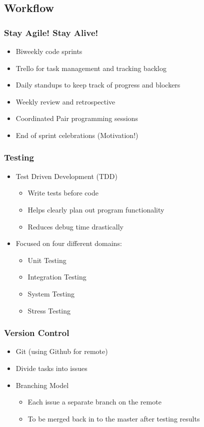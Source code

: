 \documentclass{beamer}
\begin{document}
\subsection{Workflow}
\begin{frame}
\frametitle{Stay Agile! Stay Alive!}
\begin{itemize}
\item Biweekly code sprints
\item Trello for task management and tracking backlog
\item Daily standups to keep track of progress and blockers
\item Weekly review and retrospective
\item Coordinated Pair programming sessions
\item End of sprint celebrations (Motivation!)
\end{itemize}
\end{frame}

\begin{frame}
\frametitle{Testing}
\begin{itemize}
\item Test Driven Development (TDD)
\begin{itemize}
\item Write tests before code
\item Helps clearly plan out program functionality
\item Reduces debug time drastically
\end{itemize}
\item Focused on four different domains:
\begin{itemize}
\item Unit Testing
\item Integration Testing 
\item System Testing
\item Stress Testing 
\end{itemize}
\end{itemize}
\end{frame}

\begin{frame}
\frametitle{Version Control}
\begin{itemize}
\item Git (using Github for remote)
\item Divide tasks into issues
\item Branching Model
\begin{itemize}
\item Each issue a separate branch on the remote
\item To be merged back in to the master after testing results
\end{itemize}
\end{itemize}
\end{frame}
\end{document}
